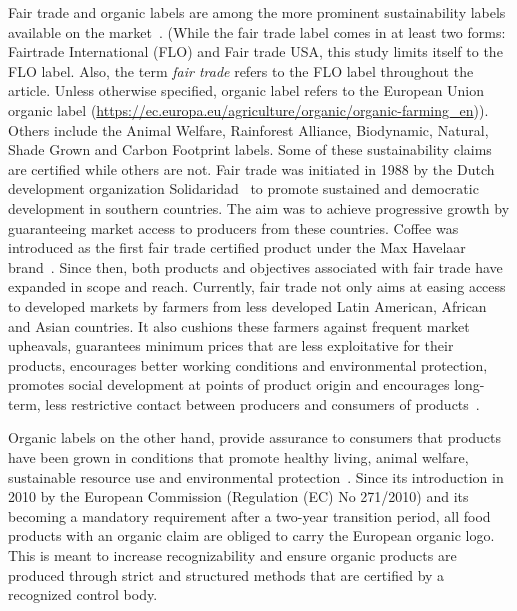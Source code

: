\documentclass[sustainability,article,accept,moreauthors,pdftex,10pt,a4paper]{Definitions/mdpi}
\theoremstyle{mdpi}
\newcounter{ex}
\newcounter{re}
\theoremstyle{mdpidefinition}
\begin{document}
\par{Fair trade and organic labels are among the more prominent sustainability labels available on the market~\cite{coff2008,ZANDER2010,Andorfer2012}. %
(While the fair trade label comes in at least two forms: Fairtrade International (FLO) and Fair trade USA, this study limits itself to the FLO label. Also, the term \textit{fair trade} refers to the FLO label throughout the article. Unless otherwise specified, organic label refers to the European Union organic label (\url{https://ec.europa.eu/agriculture/organic/organic-farming_en})). Others include the Animal Welfare, Rainforest Alliance, Biodynamic, Natural, Shade Grown and Carbon Footprint labels. Some of these sustainability claims are certified while others are not. Fair trade was initiated in 1988 by the Dutch development organization Solidaridad~\cite{Solidaridad2018} to promote sustained and democratic development in southern countries. The aim was to achieve progressive growth by guaranteeing market access to producers from these countries. Coffee was introduced as the first fair trade certified product under the Max Havelaar brand~\cite{Pay2009}. Since then, both products and objectives associated with fair trade have expanded in scope and reach. Currently, fair trade not only aims at easing access to developed markets by farmers from less developed Latin American, African and Asian countries. It also cushions these farmers against frequent market upheavals, guarantees minimum prices that are less exploitative for their products, encourages better working conditions and environmental protection, promotes social development at points of product origin and encourages long-term, less restrictive contact between producers and consumers of products~\cite{Becchetti2008,Ruben2009}.}
\par{Organic labels on the other hand, provide assurance to consumers that products have been grown in conditions that promote healthy living, animal welfare, sustainable resource use and environmental protection~\cite{Lampkin2003}. Since its introduction in 2010 by the European Commission (Regulation (EC) No 271/2010) and its becoming a mandatory requirement after a two-year transition period, all food products with an organic claim are obliged to carry the European organic logo. This is meant to increase recognizability and ensure organic products are produced through strict and structured methods that are certified by a recognized control body.}
\end{document}
